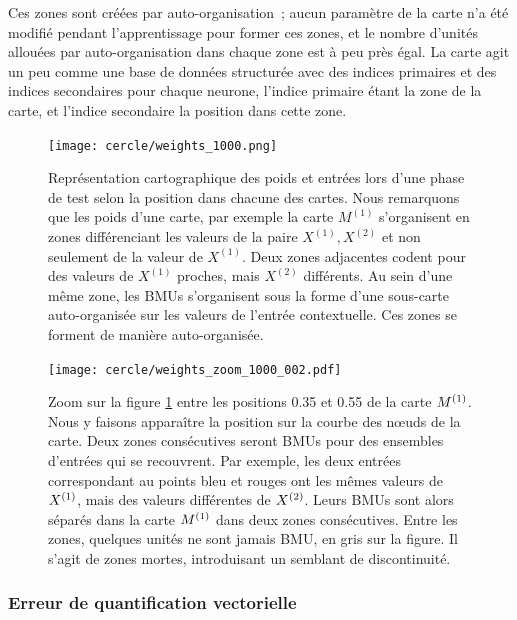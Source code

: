 \documentclass[../main]{subfiles}
\begin{document}
Ces zones sont créées par auto-organisation~; aucun paramètre de la carte n'a été modifié pendant l'apprentissage pour former ces zones, et le nombre d'unités allouées par auto-organisation dans chaque zone est à peu près égal. La carte agit un peu comme une base de données structurée avec des indices primaires et des indices secondaires pour chaque neurone, l'indice primaire étant la zone de la carte, et l'indice secondaire la position dans cette zone.

\begin{figure}
	\centering\texttt{[image: cercle/weights\_1000.png]}
	\caption{Représentation cartographique des poids et entrées lors d'une phase de test selon la position dans chacune des cartes. Nous remarquons que les poids d'une carte, par exemple la carte $M^{(1)}$ s'organisent en zones différenciant les valeurs de la paire $X^{(1)}, X^{(2)}$ et non seulement de la valeur de $X^{(1)}$. Deux zones adjacentes codent pour des valeurs de $X^{(1)}$ proches, mais $X^{(2)}$ différents. Au sein d'une même zone, les BMUs s'organisent sous la forme d'une sous-carte auto-organisée sur les valeurs de l'entrée contextuelle. Ces zones se forment de manière auto-organisée. \label{fig:w}}
\end{figure}

\begin{figure}
	\texttt{[image: cercle/weights\_zoom\_1000\_002.pdf]}
	\caption{Zoom sur la figure \ref{fig:w} entre les positions 0.35 et 0.55 de la carte $M^{({1})}$. 
	Nous y faisons apparaître la position sur la courbe des n\oe{}uds de la carte.
	Deux zones consécutives seront BMUs pour des ensembles d'entrées qui se recouvrent. Par exemple, les deux entrées correspondant au points bleu et rouges ont les mêmes valeurs de $X^{({1})}$, mais des valeurs différentes de $X^{({2})}$. Leurs BMUs sont alors séparés dans la carte $M^{({1})}$ dans deux zones consécutives.
	Entre les zones, quelques unités ne sont jamais BMU, en gris sur la figure. Il s'agit de zones mortes, introduisant un semblant de discontinuité. 
	\label{fig:w_zoom}}
\end{figure}


\subsubsection{Erreur de quantification vectorielle}
\end{document}
